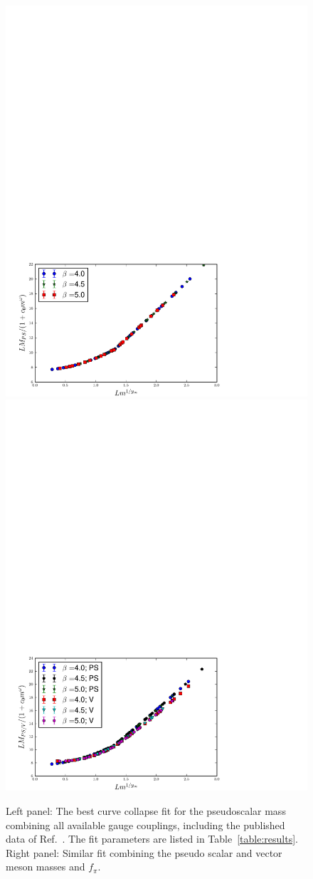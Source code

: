 \documentclass[aps,prl,twocolumn,]{revtex4}  %
\begin{document}

\begin{figure}[tbp]
\centering
  \includegraphics[width=0.45\linewidth]{pion_combined}\hfill
  \includegraphics[width=0.45\linewidth]{rho_combined}
  \caption{\label{fig:fss_combined} Left panel: The best curve collapse fit for the pseudoscalar mass combining  all available gauge couplings, including the published data of Ref.~\protect\cite{Fodor:2011tu,Aoki:2012eq}. The fit parameters are listed in Table~\protect\ref{table:results}. Right panel: Similar fit combining the pseudo scalar and  vector meson masses and $f_\pi$.  }
\end{figure}
\end{document}
